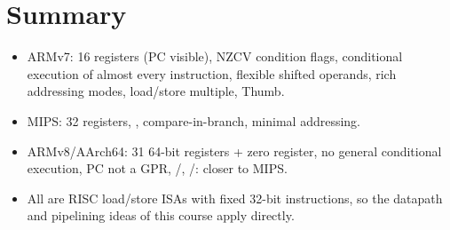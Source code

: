 \section*{Summary}
\begin{itemize}
  \item ARMv7: 16 registers (PC visible), NZCV condition flags, conditional
    execution of almost every instruction, flexible shifted operands, rich
    addressing modes, load/store multiple, Thumb.
  \item MIPS: 32 registers, , compare-in-branch, minimal
    addressing.
  \item ARMv8/AArch64: 31 64-bit registers + zero register, no general
    conditional execution, PC not a GPR, /,
    /: closer to MIPS.
  \item All are RISC load/store ISAs with fixed 32-bit instructions, so the
    datapath and pipelining ideas of this course apply directly.
\end{itemize}
